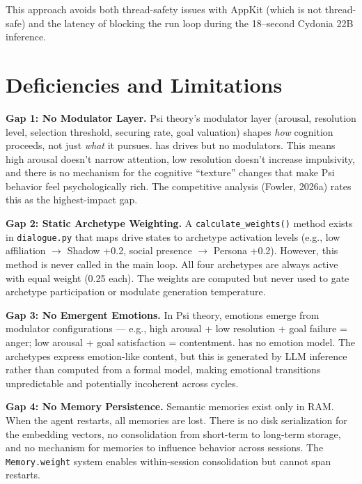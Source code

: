 \documentclass[11pt,oneside]{article}
\begin{document}
This approach avoids both thread-safety issues with AppKit (which is not thread-safe) and the latency of blocking the run loop during the 18--second Cydonia 22B inference.


\section{Deficiencies and Limitations}
\label{sec:deficiencies}

\begin{gapbox}
\textbf{Gap 1: No Modulator Layer.}
Psi theory's modulator layer (arousal, resolution level, selection threshold, securing rate, goal valuation) shapes \emph{how} cognition proceeds, not just \emph{what} it pursues.
\jungagent{} has drives but no modulators.
This means high arousal doesn't narrow attention, low resolution doesn't increase impulsivity, and there is no mechanism for the cognitive ``texture'' changes that make Psi behavior feel psychologically rich.
The competitive analysis (Fowler, 2026a) rates this as the highest-impact gap.
\end{gapbox}

\begin{gapbox}
\textbf{Gap 2: Static Archetype Weighting.}
A \texttt{calculate\_weights()} method exists in \texttt{dialogue.py} that maps drive states to archetype activation levels (e.g., low affiliation $\to$ Shadow +0.2, social presence $\to$ Persona +0.2).
However, this method is never called in the main loop.
All four archetypes are always active with equal weight (0.25 each).
The weights are computed but never used to gate archetype participation or modulate generation temperature.
\end{gapbox}

\begin{gapbox}
\textbf{Gap 3: No Emergent Emotions.}
In Psi theory, emotions emerge from modulator configurations --- e.g., high arousal + low resolution + goal failure = anger; low arousal + goal satisfaction = contentment.
\jungagent{} has no emotion model.
The archetypes express emotion-like content, but this is generated by LLM inference rather than computed from a formal model, making emotional transitions unpredictable and potentially incoherent across cycles.
\end{gapbox}

\begin{gapbox}
\textbf{Gap 4: No Memory Persistence.}
Semantic memories exist only in RAM.
When the agent restarts, all memories are lost.
There is no disk serialization for the embedding vectors, no consolidation from short-term to long-term storage, and no mechanism for memories to influence behavior across sessions.
The \texttt{Memory.weight} system enables within-session consolidation but cannot span restarts.
\end{gapbox}
\end{document}
